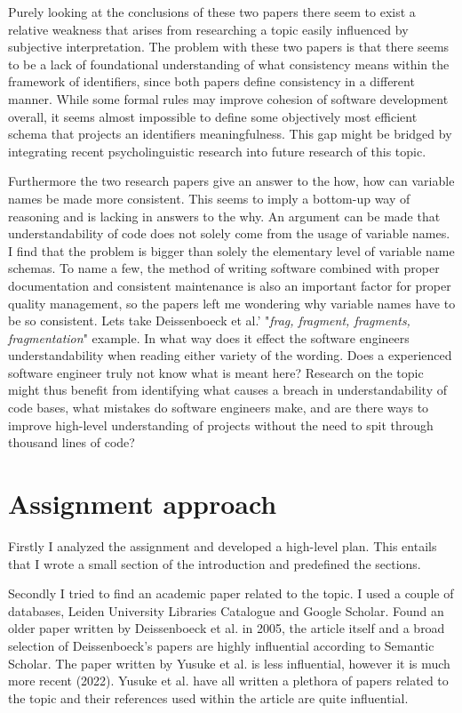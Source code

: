 \documentclass[a4paper,12pt]{article}
\begin{document}
\begin{multicols}{2}
    Purely looking at the conclusions of these two papers there seem to exist a relative weakness that arises from
    researching a topic easily influenced by subjective interpretation. The problem with these two papers is that there
    seems to be a lack of foundational
    understanding of what consistency means within the framework of identifiers, since both papers define consistency
    in a
    different manner. While some formal rules may improve cohesion of software development overall, it seems almost
    impossible to define some objectively most efficient schema that projects an identifiers meaningfulness.	This
    gap might be bridged by integrating recent psycholinguistic research into future research of
    this topic.

    Furthermore the two research papers give an answer to the how, how can variable names be made more consistent. This seems to imply a bottom-up way of reasoning and is lacking in answers to the why. An argument can be made that understandability of code does not solely come from the usage of variable names. I find that the problem is bigger than solely the elementary level of variable name schemas. To name
    a few, the  method of  writing software combined with proper documentation and consistent maintenance is also an important factor for
    proper quality management, so the papers left me wondering why variable names have to be so consistent. Lets take Deissenboeck et al.' "\textit{frag, fragment, fragments, fragmentation}" example. In what way does it effect the software engineers understandability when reading either variety of the wording. Does a experienced software engineer truly not know what is meant here? Research on the topic might thus benefit from identifying what causes a breach in understandability of code bases, what mistakes do software engineers make, and are there ways to improve high-level understanding of projects without the need to spit through thousand lines of code?

    \section*{Assignment approach}
    Firstly I analyzed the assignment and developed a high-level plan. This entails that I wrote a small section of the
    introduction and predefined the sections.

    Secondly I tried to find an academic paper related to the topic. I used a couple of databases, Leiden University
    Libraries Catalogue and Google Scholar. Found an older paper written by Deissenboeck et al. in 2005, the article
    itself
    and a broad selection of Deissenboeck's papers are highly influential according to Semantic Scholar. The paper
    written
    by Yusuke et al. is less influential, however it is much more recent (2022). Yusuke et al. have all written a
    plethora
    of papers related to the topic and their references used within the article are quite influential.


\end{multicols}
\end{document}
